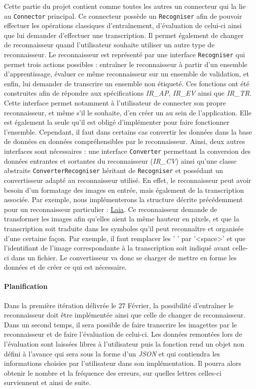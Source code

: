 Cette partie du projet contient comme toutes les autres un connecteur qui la lie au \texttt{Connector} principal. Ce connecteur possède un \texttt{Recogniser} afin de pouvoir effectuer les opérations classiques d'entraînement, d'évaluation de celui-ci ainsi que lui demander d'effectuer une transcription. Il permet également de changer de reconnaisseur quand l'utilisateur souhaite utiliser un autre type de reconnaisseur.
\newline{}
Le reconnaisseur est représenté par une interface \texttt{Recogniser} qui permet trois actions possibles : entraîner le reconnaisseur à partir d'un ensemble d'apprentissage, évaluer ce même reconnaisseur sur un ensemble de validation, et enfin, lui demander de transcrire un ensemble non étiqueté. Ces fonctions ont été construites afin de répondre aux spécifications \textit{IR\_AP}, \textit{IR\_EV} ainsi que \textit{IR\_TR}.
Cette interface permet notamment à l'utilisateur de connecter son propre reconnaisseur, et même s'il le souhaite, d'en créer un au sein de l'application. Elle est également la seule qu'il est obligé d'implémenter pour faire fonctionner l'ensemble. Cependant, il faut dans certains cas convertir les données dans la base de données en données compréhensibles par le reconnaisseur. Ainsi, deux autres interfaces sont nécessaires : une interface \texttt{Converter} permettant la conversion des données entrantes et sortantes du reconnaisseur (\textit{IR\_CV}) ainsi qu'une classe abstraite \texttt{ConverterRecogniser} héritant de \texttt{Recogniser} et possédant un convertisseur adapté au reconnaisseur utilisé. En effet, le reconnaisseur peut avoir besoin d'un formatage des images en entrée, mais également de la transcription associée. Par exemple, nous implémenterons la structure décrite précédemment pour un reconnaisseur particulier : \href{https://github.com/jpuigcerver/Laia}{Laia}. Ce reconnaisseur demande de transformer les images afin qu'elles aient la même hauteur en pixels, et que la transcription soit traduite dans les symboles qu'il peut reconnaître et organisée d'une certaine façon. Par exemple, il faut remplacer les ' ' par '<space>' et que l'identifiant de l'image correspondante à la transcription soit indiqué avant celle-ci dans un fichier. Le convertisseur va donc se charger de mettre en forme les données et de créer ce qui est nécessaire.

\paragraph{Planification}
Dans la première itération délivrée le 27 Février, la possibilité d'entraîner le reconnaisseur doit être implémentée ainsi que celle de changer de reconnaisseur. Dans un second temps, il sera possible de faire transcrire les imagettes par le reconnaisseur et de faire l'évaluation de celui-ci. Les données remontées lors de l'évaluation sont laissées libres à l'utilisateur puis la fonction rend un objet non défini à l'avance qui sera sous la forme d'un \textit{JSON} et qui contiendra les informations choisies par l'utilisateur dans son implémentation. Il pourra alors obtenir le nombre et la fréquence des erreurs, sur quelles lettres celles-ci surviennent et ainsi de suite.

